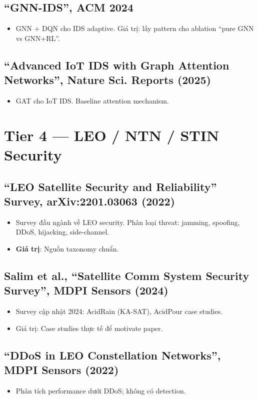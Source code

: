 \documentclass[11pt,a4paper]{article}
\begin{document}
\subsection{``GNN-IDS'', ACM 2024}
\begin{itemize}
  \item GNN + DQN cho IDS adaptive. Giá trị: lấy pattern cho ablation ``pure GNN vs GNN+RL''.
\end{itemize}

\subsection{``Advanced IoT IDS with Graph Attention Networks'', Nature Sci. Reports (2025)}
\begin{itemize}
  \item GAT cho IoT IDS. Baseline attention mechanism.
\end{itemize}

\section{Tier 4 --- LEO / NTN / STIN Security}

\subsection{``LEO Satellite Security and Reliability'' Survey, arXiv:2201.03063 (2022)}
\begin{itemize}
  \item Survey đầu ngành về LEO security. Phân loại threat: jamming, spoofing, DDoS, hijacking, side-channel.
  \item \textbf{Giá trị}: Nguồn taxonomy chuẩn.
\end{itemize}

\subsection{Salim et al., ``Satellite Comm System Security Survey'', MDPI Sensors (2024)}
\begin{itemize}
  \item Survey cập nhật 2024: AcidRain (KA-SAT), AcidPour case studies.
  \item Giá trị: Case studies thực tế để motivate paper.
\end{itemize}

\subsection{``DDoS in LEO Constellation Networks'', MDPI Sensors (2022)}
\begin{itemize}
  \item Phân tích performance dưới DDoS; không có detection.
\end{itemize}
\end{document}
